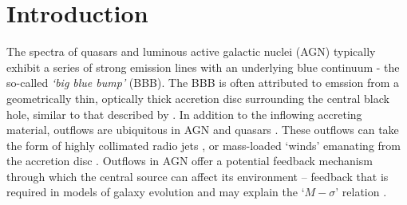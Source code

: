 \documentclass[useAMS,usenatbib]{mn2e_x}
\begin{document}



%
%

\section{Introduction}


The spectra of 
quasars and luminous active galactic nuclei (AGN) 
typically exhibit a series of strong emission lines
with an underlying blue continuum - the so-called {\sl `big blue bump'} (BBB). 
The BBB is often attributed to emssion from a 
geometrically thin, optically thick accretion disc surrounding the central black hole, similar
to that described by \cite{shakurasunyaev1973}.
In addition to the inflowing accreting material,
outflows are ubiquitous in AGN
and quasars \citep{kellerman1989,ganguly2008}. These outflows can take the form of 
highly collimated radio jets \citep[e.g.][]{hazard1963,potash1980,perley1984,marscher2006}, 
or mass-loaded `winds' emanating from the accretion disc 
\citep{weymann1991,turnermiller2009}. 
Outflows in AGN offer a 
potential feedback mechanism through which the central source can 
affect its environment \citep{king2003,king2005,fabian2012}
-- feedback that is required in models of galaxy evolution \citep{springel2005}
and may explain the `$M-\sigma$' relation \citep{silkrees1998,haring2004}.
\end{document}
